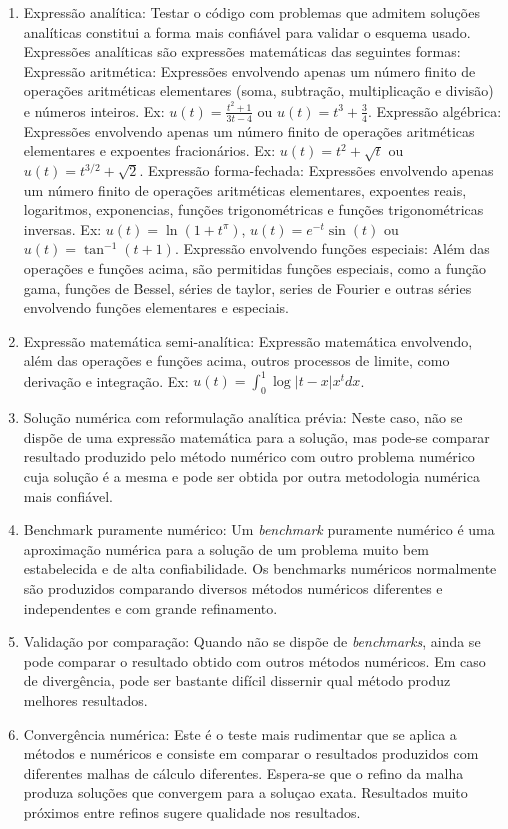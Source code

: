 \begin{enumerate}
\item Expressão analítica: Testar o código com problemas que admitem soluções analíticas constitui a forma mais confiável para validar o esquema usado. Expressões analíticas são expressões matemáticas das seguintes formas:
\subitem Expressão aritmética: Expressões envolvendo apenas um número finito de operações aritméticas elementares (soma, subtração, multiplicação e divisão) e números inteiros. Ex: $u(t)=\frac{t^2+1}{3t-4}$ ou $u(t)=t^3+\frac{3}{4}.$
\subitem Expressão algébrica:  Expressões envolvendo apenas um número finito de operações aritméticas elementares e expoentes fracionários. Ex: $u(t)=t^2+ \sqrt{t} $ ou $u(t)=t^{3/2}+\sqrt{2}$.
\subitem Expressão forma-fechada: Expressões envolvendo apenas um número finito de operações aritméticas elementares, expoentes reais, logaritmos, exponencias, funções trigonométricas e funções trigonométricas inversas. Ex: $u(t)=\ln(1+t^{\pi})$, $u(t)=e^{-t}\sin(t)$ ou $u(t)=\tan^{-1}(t+1)$.
\subitem Expressão envolvendo funções especiais: Além das operações e funções acima, são permitidas funções especiais, como a função gama, funções de Bessel, séries de taylor, series de Fourier e outras séries envolvendo funções elementares e especiais.
\item Expressão matemática semi-analítica: Expressão matemática envolvendo, além das operações e funções acima, outros processos de limite, como derivação e integração. Ex: $u(t)=\int_{0}^1 \log|t-x|x^t dx$.
\item Solução numérica com reformulação analítica prévia: Neste caso, não se dispõe de uma expressão matemática para a solução, mas pode-se comparar resultado produzido pelo método numérico com outro problema numérico cuja solução é a mesma e pode ser obtida por outra metodologia numérica mais confiável.
\item Benchmark puramente numérico: Um {\it benchmark} puramente numérico é uma aproximação numérica para a solução de um problema muito bem estabelecida e de alta confiabilidade. Os benchmarks numéricos normalmente são produzidos comparando diversos métodos numéricos diferentes e independentes e com grande refinamento.
\item Validação por comparação: Quando não se dispõe de {\it benchmarks}, ainda se pode comparar o resultado obtido com outros métodos numéricos. Em caso de divergência, pode ser bastante difícil dissernir qual método produz melhores resultados.
\item Convergência numérica: Este é o teste mais rudimentar que se aplica a métodos e numéricos e consiste em comparar o resultados produzidos com diferentes malhas de cálculo diferentes. Espera-se que o refino da malha produza soluções que convergem para a soluçao exata. Resultados muito próximos entre refinos sugere qualidade nos resultados.
\end{enumerate}



